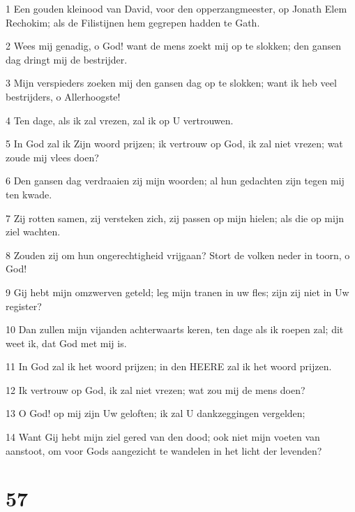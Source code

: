 \par 1 Een gouden kleinood van David, voor den opperzangmeester, op Jonath Elem Rechokim; als de Filistijnen hem gegrepen hadden te Gath.
\par 2 Wees mij genadig, o God! want de mens zoekt mij op te slokken; den gansen dag dringt mij de bestrijder.
\par 3 Mijn verspieders zoeken mij den gansen dag op te slokken; want ik heb veel bestrijders, o Allerhoogste!
\par 4 Ten dage, als ik zal vrezen, zal ik op U vertrouwen.
\par 5 In God zal ik Zijn woord prijzen; ik vertrouw op God, ik zal niet vrezen; wat zoude mij vlees doen?
\par 6 Den gansen dag verdraaien zij mijn woorden; al hun gedachten zijn tegen mij ten kwade.
\par 7 Zij rotten samen, zij versteken zich, zij passen op mijn hielen; als die op mijn ziel wachten.
\par 8 Zouden zij om hun ongerechtigheid vrijgaan? Stort de volken neder in toorn, o God!
\par 9 Gij hebt mijn omzwerven geteld; leg mijn tranen in uw fles; zijn zij niet in Uw register?
\par 10 Dan zullen mijn vijanden achterwaarts keren, ten dage als ik roepen zal; dit weet ik, dat God met mij is.
\par 11 In God zal ik het woord prijzen; in den HEERE zal ik het woord prijzen.
\par 12 Ik vertrouw op God, ik zal niet vrezen; wat zou mij de mens doen?
\par 13 O God! op mij zijn Uw geloften; ik zal U dankzeggingen vergelden;
\par 14 Want Gij hebt mijn ziel gered van den dood; ook niet mijn voeten van aanstoot, om voor Gods aangezicht te wandelen in het licht der levenden?

\chapter{57}

